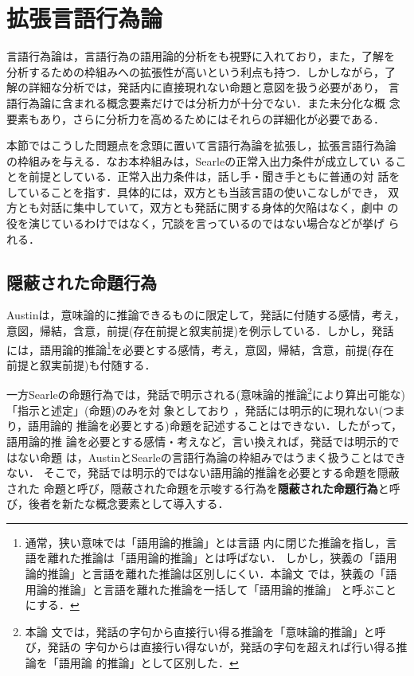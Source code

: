 \section{拡張言語行為論}

言語行為論は，言語行為の語用論的分析をも視野に入れており，また，了解を
分析するための枠組みへの拡張性が高いという利点も持つ．しかしながら，了
解の詳細な分析では，発話内に直接現れない命題と意図を扱う必要があり，
言語行為論に含まれる概念要素だけでは分析力が十分でない．また未分化な概
念要素もあり，さらに分析力を高めるためにはそれらの詳細化が必要である．

本節ではこうした問題点を念頭に置いて言語行為論を拡張し，拡張言語行為論
の枠組みを与える．なお本枠組みは，Searle\cite{searle}の正常入出力条件が成立してい
ることを前提としている．正常入出力条件は，話し手・聞き手ともに普通の対
話をしていることを指す．具体的には，双方とも当該言語の使いこなしができ，
双方とも対話に集中していて，双方とも発話に関する身体的欠陥はなく，劇中
の役を演じているわけではなく，冗談を言っているのではない場合などが挙げ
られる．

\subsection{隠蔽された命題行為}

Austinは，意味論的に推論できるものに限定して，発話に付随する感情，考え，
意図，帰結，含意，前提(存在前提と叙実前提)を例示している．しかし，発話
には，語用論的推論\footnote{通常，狭い意味では「語用論的推論」とは言語
内に閉じた推論を指し，言語を離れた推論は「語用論的推論」とは呼ばない．
しかし，狭義の「語用論的推論」と言語を離れた推論は区別しにくい．本論文
では，狭義の「語用論的推論」と言語を離れた推論を一括して「語用論的推論」
と呼ぶことにする．}を必要とする感情，考え，意図，帰結，含意，前提(存在
前提と叙実前提)も付随する．

一方Searleの命題行為では，発話で明示される(意味論的推論\footnote{本論
文では，発話の字句から直接行い得る推論を「意味論的推論」と呼び，発話の
字句からは直接行い得ないが，発話の字句を超えれば行い得る推論を「語用論
的推論」として区別した．}により算出可能な)「指示と述定」(命題)のみを対
象としており\cite{searle} ，発話には明示的に現れない(つまり，語用論的
推論を必要とする)命題を記述することはできない．したがって，語用論的推
論を必要とする感情・考えなど，言い換えれば，発話では明示的ではない命題
は，AustinとSearleの言語行為論の枠組みではうまく扱うことはできない．
そこで，発話では明示的ではない語用論的推論を必要とする命題を隠蔽された
命題と呼び，隠蔽された命題を示唆する行為を{\bf 隠蔽された命題行為}と呼
び，後者を新たな概念要素として導入する．





